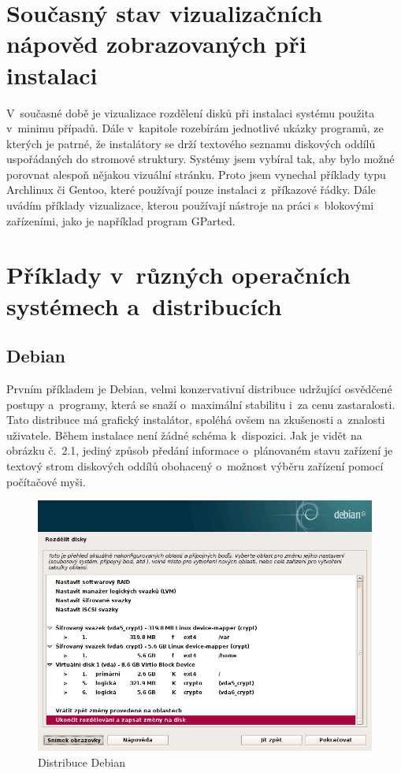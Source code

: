 \documentclass[printed,color,table,oneside,nolot,nolof]{fithesis}
\begin{document}
\section{Současný stav vizualizačních nápověd zobrazovaných při instalaci}
	V~současné době je vizualizace rozdělení disků při instalaci systému použita v~minimu případů. Dále v~kapitole rozebírám jednotlivé ukázky programů, ze kterých je patrné, 
	že instalátory se drží textového seznamu diskových oddílů uspořádaných do stromové struktury. Systémy jsem vybíral tak, aby bylo možné porovnat alespoň nějakou vizuální stránku. Proto jsem vynechal
	příklady typu Archlinux či Gentoo, které používají pouze instalaci z~příkazové řádky.  Dále uvádím příklady vizualizace, kterou používají nástroje na práci s~blokovými zařízeními, 
	jako je například program GParted.

\section{Příklady v~různých operačních systémech a~distribucích}

\subsection{Debian}

	Prvním příkladem je Debian, velmi konzervativní distribuce udržující osvědčené postupy a~programy, která se snaží o~maximální stabilitu i~za cenu zastaralosti. 
	Tato distribuce má grafický instalátor, spoléhá ovšem na zkušenosti a~znalosti uživatele. Během instalace není žádné schéma k~dispozici. Jak je vidět na obrázku č.~2.1, jediný způsob předání 
	informace o~plánovaném stavu zařízení je textový strom diskových oddílů obohacený o~možnost výběru zařízení pomocí počítačové myši.

\begin{figure}[t!]
	\caption{Distribuce Debian}
	\centering
	\includegraphics[width=.8\columnwidth]{pictures/debian1.png}
\end{figure}
\end{document}
